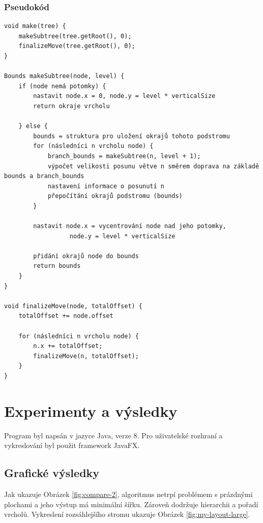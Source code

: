 \documentclass[12pt, a4paper]{report}
\begin{document}
\vfill

\subsection{Pseudokód}
\begin{lstlisting}
void make(tree) {
    makeSubtree(tree.getRoot(), 0);
    finalizeMove(tree.getRoot(), 0);
}

Bounds makeSubtree(node, level) {
    if (node nemá potomky) {
        nastavit node.x = 0, node.y = level * verticalSize 
        return okraje vrcholu
        
    } else {
        bounds = struktura pro uložení okrajů tohoto podstromu
        for (následníci n vrcholu node) {
            branch_bounds = makeSubtree(n, level + 1);
            výpočet velikosti posunu větve n směrem doprava na základě bounds a branch_bounds
            nastavení informace o posunutí n
            přepočítání okrajů podstromu (bounds)
        }
        
        nastavit node.x = vycentrování node nad jeho potomky,
                  node.y = level * verticalSize 
        
        přidání okrajů node do bounds
        return bounds
    }
}

void finalizeMove(node, totalOffset) {
    totalOffset += node.offset

    for (následníci n vrcholu node) {
        n.x += totalOffset;
        finalizeMove(n, totalOffset);
    }
}
\end{lstlisting}

\chapter{Experimenty a výsledky}
Program byl napsán v jazyce Java, verze 8. Pro uživatelské rozhraní a vykreslování byl použit framework JavaFX.

\section{Grafické výsledky}
Jak ukazuje Obrázek \ref{fig:compare-2}, algoritmus netrpí problémem s prázdnými plochami a jeho výstup má minimální šířku. Zároveň dodržuje hierarchii a pořadí vrcholů. Vykreslení rozsáhlejšího stromu ukazuje Obrázek \ref{fig:my-layout-large}.
\end{document}
